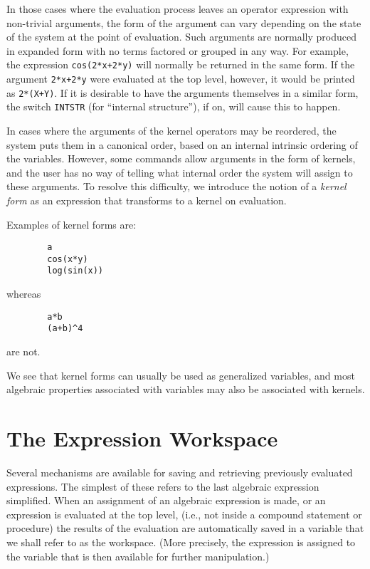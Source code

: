 \hypertarget{switch:INTSTR}{}
In those cases where the evaluation process leaves an operator expression
with non-trivial arguments, the form of the argument can vary depending on
the state of the system at the point of evaluation.  Such arguments are
normally produced in expanded form with no terms factored or grouped in
any way.  For example, the expression \texttt{cos(2*x+2*y)} will normally be
returned in the same form.  If the argument \texttt{2*x+2*y} were evaluated
at the top level, however, it would be printed as \texttt{2*(X+Y)}.  If it is
desirable to have the arguments themselves in a similar form, the switch
\texttt{INTSTR} (for ``internal structure''), if on, will
cause this to happen.

In cases where the arguments of the kernel operators may be reordered, the
system puts them in a canonical order, based on an internal intrinsic
ordering of the variables. However, some commands allow arguments in the
form of kernels, and the user has no way of telling what internal order the
system will assign to these arguments. To resolve this difficulty, we
introduce the notion of a \emph{kernel form} as an
expression that transforms to a kernel on evaluation.

Examples of kernel forms are:
\begin{verbatim}
        a
        cos(x*y)
        log(sin(x))
\end{verbatim}
whereas
\begin{verbatim}
        a*b
        (a+b)^4
\end{verbatim}
are not.

We see that kernel forms can usually be used as generalized variables, and
most algebraic properties associated with variables may also be associated
with kernels.

\section{The Expression Workspace}\label{Workspace}

Several mechanisms are available for saving and retrieving previously
evaluated expressions.  The simplest of these refers to the last algebraic
expression simplified.  When an assignment of an algebraic expression is
made, or an expression is evaluated at the top level, (i.e., not inside a
compound statement or procedure) the results of the evaluation are
automatically saved in a variable  that we shall refer to as the
workspace. (More precisely, the expression is assigned to the variable
 that is then available for further manipulation.)

